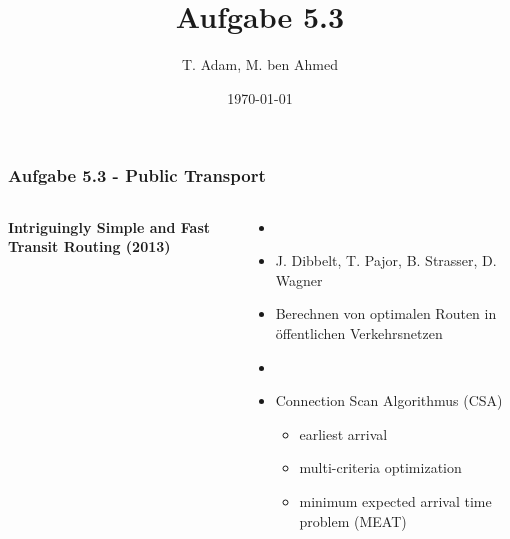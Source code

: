 \documentclass[aspectratio=169]{beamer}
\title[Aufgabe 4.3]{Aufgabe 5.3} %
\author{T. Adam, M. ben Ahmed} %
\institute[UOS] %
{

Universität Osnabrück \\ %

\medskip
\textit{Æ} %


}
\date{\today} %
\begin{document}
\begin{frame}
\titlepage %
\end{frame}





\begin{frame}
	\frametitle{Aufgabe 5.3 - Public Transport}
	\begin{columns}[c] %
		
		\textbf{Intriguingly Simple and Fast Transit Routing (2013)}
		\begin{itemize}
			\item[]
			\item J. Dibbelt, T. Pajor, B. Strasser, D. Wagner
			\item Berechnen von optimalen Routen in öffentlichen Verkehrsnetzen
			\item[]
			\item Connection Scan Algorithmus (CSA)
			\begin{itemize}
				\item earliest arrival
				\item multi-criteria optimization
				\item minimum expected arrival time problem (MEAT)
			\end{itemize}

		\end{itemize}	
	\end{columns}
	\end{frame}
	
\end{document}
